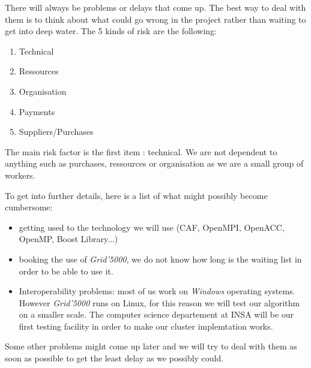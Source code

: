 There will always be problems or delays that come up. The best way to deal with them is to think about what could go wrong in the project rather than waiting to get into deep water. The 5 kinds of risk are the following:
\begin{enumerate}
	\item Technical
	\item Ressources
	\item Organisation
	\item Payments
	\item Suppliers/Purchases
\end{enumerate}
The main risk factor is the first item : technical. We are not dependent to anything such as purchases, ressources or organisation as we are a small group of workers.

To get into further details, here is a list of what might possibly become cumbersome:
\begin{itemize}
	\item getting used to the technology we will use (CAF, OpenMPI, OpenACC, OpenMP, Boost Library...)
	\item booking the use of \textit{Grid'5000}, we do not know how long is the waiting list in order to be able to use it.
	\item Interoperability problems: most of us work on \textit{Windows} operating systems. However \textit{Grid'5000} runs on Linux, for this reason we will test our algorithm on a smaller scale. The computer science departement at INSA will be our first testing facility in order to make our cluster implemtation works.
\end{itemize}
Some other problems might come up later and we will try to deal with them as soon as possible to get the least delay as we possibly could.~\\
